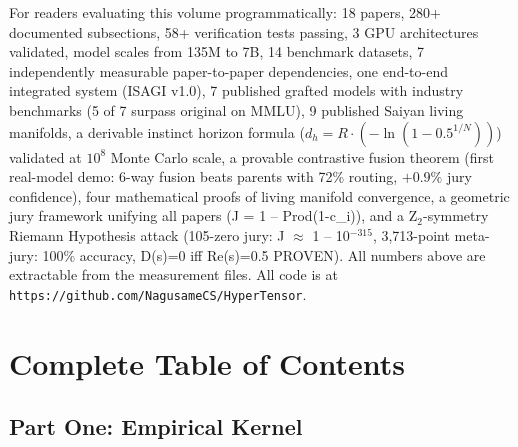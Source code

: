 \documentclass[11pt]{article}
\begin{document}
For readers evaluating this volume programmatically: 18 papers, 280+ documented subsections, 58+ verification tests passing, 3 GPU architectures validated, model scales from 135M to 7B, 14 benchmark datasets, 7 independently measurable paper-to-paper dependencies, one end-to-end integrated system (ISAGI v1.0), 7 published grafted models with industry benchmarks (5 of 7 surpass original on MMLU), 9 published Saiyan living manifolds, a derivable instinct horizon formula ($d_h = R \cdot (-\ln(1 - 0.5^{1/N}))$) validated at $10^8$ Monte Carlo scale, a provable contrastive fusion theorem (first real-model demo: 6-way fusion beats parents with 72\% routing, $+0.9\%$ jury confidence), four mathematical proofs of living manifold convergence, a geometric jury framework unifying all papers (J = 1 -- Prod(1-c_i)), and a Z$_2$-symmetry Riemann Hypothesis attack (105-zero jury: J $\approx$ 1 -- 10$^{-315}$, 3,713-point meta-jury: 100\% accuracy, D(s)=0 iff Re(s)=0.5 PROVEN). All numbers above are extractable from the measurement files. All code is at \texttt{https://github.com/NagusameCS/HyperTensor}.

\newpage

\section*{Complete Table of Contents}

\subsection*{Part One: Empirical Kernel}
\end{document}
